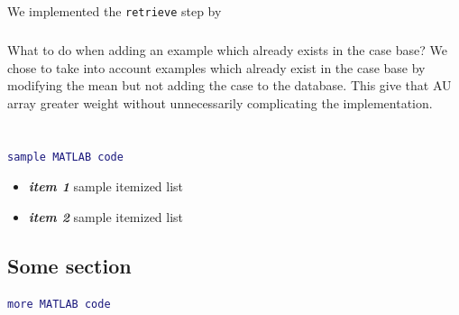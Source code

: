 \documentclass[a4paper,12pt,oneside,final]{report}
\newenvironment{changemargin}[2]{\begin{list}{}{%
\setlength{\topsep}{0pt}%
\setlength{\leftmargin}{0pt}%
\setlength{\rightmargin}{0pt}%
\setlength{\listparindent}{\parindent}%
\setlength{\itemindent}{\parindent}%
\setlength{\parsep}{0pt plus 1pt}%
\addtolength{\leftmargin}{#1}%
\addtolength{\rightmargin}{#2}%
}\item }{\end{list}}
\begin{document}
We implemented the \verb+retrieve+ step by 
\paragraph{}
What to do when adding an example which already exists in the case base?  We chose to take into account examples which already exist in the case base by modifying the mean but not adding the case to the database.  This give that AU array greater weight without unnecessarily complicating the implementation.

\paragraph{}

\chapter{}
\paragraph{}
\section{}
\paragraph{} 
\begin{changemargin}{-5mm}{-5mm}
\begin{lstlisting}[language=Matlab, frame=single]
sample MATLAB code
\end{lstlisting}
\end{changemargin}
\label{ch:build}
\begin{itemize}
\item {\bf \textit{item 1} } sample itemized list
\item {\bf \textit{item 2} } sample itemized list
\end{itemize}

\paragraph{}
\paragraph{}
\section{Some section}
\begin{changemargin}{-5mm}{-5mm}
\begin{lstlisting}[language=Matlab, frame=single]
more MATLAB code
\end{lstlisting}
\end{changemargin}
\end{document}
